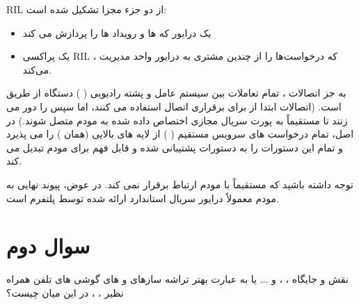 \documentclass{report}
\begin{document}
            RIL
             از دو جزء مجزا تشکیل شده است: 
             \begin{itemize}
             	\item  یک درایور 
             	 که 
             	 ها و رویداد ها را پردازش می کند
             	\item یک پراکسی 
             	RIL
             	، که درخواست‌ها را از چندین مشتری به درایور 
             	 واحد مدیریت می‌کند. 
             \end{itemize}
             به جز اتصالات 
             ، تمام تعاملات بین سیستم عامل 
             و 
             پشته رادیویی (
             )
              دستگاه از طریق 
               است. (اتصالات
                 ابتدا از
                   برای برقراری اتصال استفاده می کنند، اما سپس 
                    را دور می زنند تا مستقیماً به پورت سریال مجازی اختصاص داده شده به مودم متصل شوند.) در اصل،
                      تمام درخواست های سرویس مستقیم (
                      ) از لایه های بالایی (همان 
                      ) را می پذیرد و تمام این دستورات را به دستورات پشتیبانی شده و قابل فهم برای مودم تبدیل می کند.
            
            توجه داشته باشید که
              مستقیماً با مودم ارتباط برقرار نمی کند. در عوض، پیوند نهایی به مودم معمولاً درایور سریال استاندارد ارائه شده توسط پلتفرم
                است.
            
\section*{سوال دوم}
نقش و جایگاه
 ، 
 ،
  و ... یا به عبارت بهتر تراشه سازهای
   و
   های گوشی های تلفن همراه نظیر
    ،
     ،
       در این میان چیست؟
\end{document}
